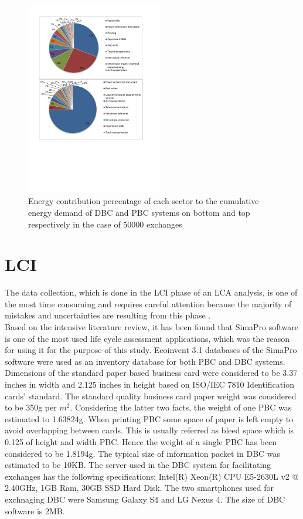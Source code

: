\documentclass[conference]{IEEEtran}
\begin{document}
\begin{figure}[h]
\centering
\includegraphics[width=6cm]{screen3.pdf}
\caption{Energy contribution percentage of each sector to the cumulative energy demand of DBC and PBC systems on bottom and top respectively in the case of 50000 exchanges}
\label{screecn3Sectors}
\end{figure}

\section{LCI}


The data collection, which is done in the LCI phase of an LCA analysis, is one of the most time consuming and requires careful attention because the majority of mistakes and uncertainties are resulting from this phase \cite{jungbluth2011environmental}.\\
Based on the intensive literature review, it has been found that SimaPro software is one of the most used life cycle assessment applications, which was the reason for using it for the purpose of this study. Ecoinvent 3.1 databases of the SimaPro software were used as an inventory database for both PBC and DBC systems. Dimensions of the standard paper based business card were considered to be 3.37 inches in width and 2.125 inches in height based on ISO/IEC 7810 Identification cards' standard.  The standard quality business card paper weight was considered to be 350g per $m^2$. Considering the latter two facts, the weight of one PBC was estimated to 1.63824g. When printing PBC some space of paper is left empty to avoid overlapping between cards. This is usually referred as bleed space which is 0.125 of height and width PBC. Hence the weight of a single PBC has been considered to be 1.8194g. The typical size of information packet in DBC was estimated to be 10KB. The server used in the DBC system for facilitating exchanges has the following specifications; Intel(R) Xeon(R) CPU E5-2630L v2 @ 2.40GHz, 1GB Ram, 30GB SSD Hard Disk. The two smartphones used for exchnaging DBC were Samsung Galaxy S4 and LG Nexus 4. The size of DBC software is 2MB.\\
\end{document}
